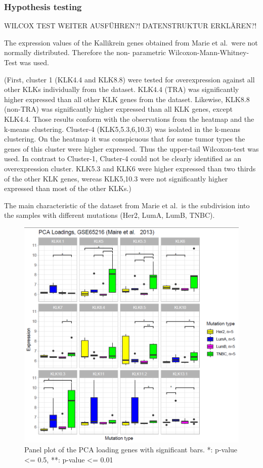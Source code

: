 \documentclass[
]{article}
\begin{document}
\hypertarget{hypothesis-testing}{%
\subsubsection{Hypothesis testing}\label{hypothesis-testing}}

WILCOX TEST WEITER AUSFÜHREN?! DATENSTRUKTUR ERKLÄREN?!

The expression values of the Kallikrein genes obtained from Marie et
al.~were not normally distributed. Therefore the non- parametric
Wilcoxon-Mann-Whitney-Test was used.

(First, cluster 1 (KLK4.4 and KLK8.8) were tested for overexpression
against all other KLKs individually from the dataset. KLK4.4 (TRA) was
significantly higher expressed than all other KLK genes from the
dataset. Likewise, KLK8.8 (non-TRA) was significantly higher expressed
than all KLK genes, except KLK4.4. Those results conform with the
observations from the heatmap and the k-means clustering. Cluster-4
(KLK5,5.3,6,10.3) was isolated in the k-means clustering. On the heatmap
it was conspicuous that for some tumor types the genes of this cluster
were higher expressed. Thus the upper-tail Wilcoxon-test was used. In
contrast to Cluster-1, Cluster-4 could not be clearly identified as an
overexpression cluster. KLK5.3 and KLK6 were higher expressed than two
thirds of the other KLK genes, wereas KLK5,10.3 were not significantly
higher expressed than most of the other KLKs.)

The main characteristic of the dataset from Marie et al.~is the
subdivision into the samples with different mutations (Her2, LumA, LumB,
TNBC).

\begin{figure}

{\centering \includegraphics[width=0.5\linewidth]{images/breast_panel_loadings_test} 

}

\caption{Panel plot of the PCA loading genes with significant bars. *: p-value <= 0.5, **: p-value <= 0.01 }\label{fig:Hypothesis test panel plot with significant bars}
\end{figure}
\end{document}
